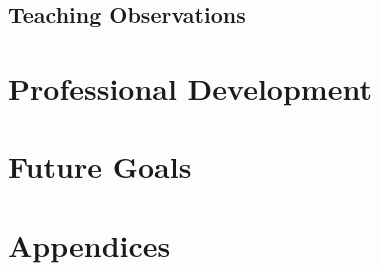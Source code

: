 \documentclass{article}
\begin{document}
\subsection{Teaching Observations}

\section{Professional Development}
\section{Future Goals}

\appendix
\section*{Appendices}
\section{}
\end{document}
